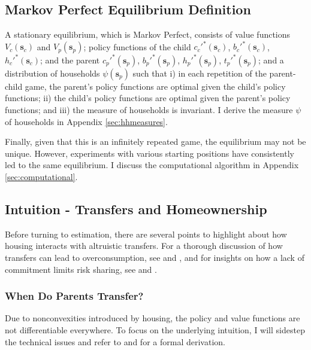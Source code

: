 \documentclass[12pt]{article}
\begin{document}
\subsection{Markov Perfect Equilibrium Definition}
A stationary equilibrium, which is Markov Perfect, consists of value functions $V_c(\mathbf{s}_c)$ and $V_p(\mathbf{s}_p)$; policy functions of the child $c_c'^*(\mathbf{s}_c)$, $b_c'^*(\mathbf{s}_c)$, $h_c'^*(\mathbf{s}_c)$; and the parent $c_p'^*(\mathbf{s}_p)$, $b_p'^*(\mathbf{s}_p)$, $h_p'^*(\mathbf{s}_p)$, $t_p'^*(\mathbf{s}_p)$; and a distribution of households $\psi(\mathbf{s}_p)$ such that i) in each repetition of the parent-child game, the parent's policy functions are optimal given the child's policy functions; ii) the child's policy functions are optimal given the parent's policy functions; and iii) the measure of households is invariant. I derive the measure $\psi$ of households in Appendix \ref{sec:hhmeasures}.

Finally, given that this is an infinitely repeated game, the equilibrium may not be unique. However, experiments with various starting positions have consistently led to the same equilibrium. I discuss the computational algorithm in Appendix \ref{sec:computational}.


\subsection{Intuition - Transfers and Homeownership}\label{sec:modelintuition}
Before turning to estimation, there are several points to highlight about how housing interacts with altruistic transfers. For a thorough discussion of how transfers can lead to overconsumption, see \cite{Altonji1997a} and \cite{Barczyk2014}, and for insights on how a lack of commitment limits risk sharing, see \cite{Attanasio2018} and \cite{Mommaerts2016}. 

\subsubsection{When Do Parents Transfer?}
Due to nonconvexities introduced by housing, the policy and value functions are not differentiable everywhere. To focus on the underlying intuition, I will sidestep the technical issues and refer to \cite{Barczyk2020} and \cite{Chu2020} for a formal derivation.
\end{document}
